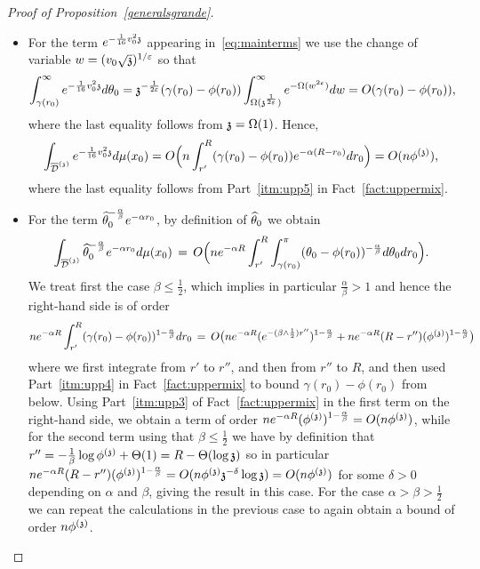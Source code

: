 \begin{proof}[Proof of Proposition~\ref{generalsgrande}]
\begin{itemize}
\item 
For the term $e^{-\frac{1}{16}v_0^2\ss}$ appearing in~\eqref{eq:mainterms} we use the change of variable $w=(v_0\sqrt{\ss})^{1/\varepsilon}$ so that 
\[\int_{\gamma(r_0)}^\infty e^{-\frac{1}{16}v_0^2\ss}d\theta_0=\ss^{-\frac{1}{2\varepsilon}}(\gamma(r_0)-\phi(r_0))\int_{\Omega(\ss^{\frac{1}{2\varepsilon}})}^{\infty}e^{-\Omega(w^{2\varepsilon})}dw=O(\gamma(r_0)-\phi(r_0)),\]
where the last equality follows from $\ss=\Omega(1)$. Hence,
\[
\int_{\ndt}e^{-\frac{1}{16}v_0^2\ss}d\mu(x_0)
=O\Big(n\int_{r'}^R (\gamma(r_0)-\phi(r_0))e^{-\alpha(R-r_0)}dr_0\Big)=O(n\phis),
\]
where the last equality follows from Part~\eqref{itm:upp5} in Fact~\ref{fact:uppermix}.
\item 
For the term $\hatt^{-\frac{\alpha}{\beta}}e^{-\alpha r_0}$, by definition of $\hatt$ we obtain  %
\[
\int_{\ndt}\hatt^{-\frac{\alpha}{\beta}}e^{-\alpha r_0}d\mu(x_0)\,=\,O\Big(ne^{-\alpha R}\int_{r'}^R\int_{\gamma(r_0)}^\pi (\theta_0-\phi(r_0))^{-\frac{\alpha}{\beta}}d\theta_0dr_0\Big).\]
We treat first the case $\beta\leq\frac{1}{2}$, which implies in particular $\frac{\alpha}{\beta}>1$ and hence the right-hand side is of order
\[ne^{-\alpha R}\int_{r'}^R(\gamma(r_0)-\phi(r_0))^{1-\frac{\alpha}{\beta}}dr_0\,=\,O\big(ne^{-\alpha R}(e^{-(\beta\wedge\frac{1}{2})r''})^{1-\frac{\alpha}{\beta}}+ne^{-\alpha R}(R-r'')(\phis)^{1-\frac{\alpha}{\beta}}\big)\]
where we first integrate from $r'$ to $r''$, and then from $r''$ to $R$, and then used Part~\eqref{itm:upp4} in Fact~\ref{fact:uppermix} to bound $\gamma(r_0)-\phi(r_0)$ from below. Using Part~\eqref{itm:upp3} of Fact~\ref{fact:uppermix} in the first term on the right-hand side, we obtain a term of order $ne^{-\alpha R}(\phis)^{1-\frac{\alpha}{\beta}}=O(n\phis)$, while for the second term using that $\beta\leq\frac{1}{2}$ we have by definition that $r''=-\frac{1}{\beta}\log\phis+\Theta(1)=R-\Theta(\log\ss)$ so in particular $ne^{-\alpha R}(R-r'')(\phis)^{1-\frac{\alpha}{\beta}}=O(n\phis\ss^{-\delta}\log\ss)=O(n\phis)$ for some $\delta>0$ depending on $\alpha$ and $\beta$, giving the result in this case.
For the case $\alpha>\beta>\frac12$ we can repeat the calculations in the previous case to again obtain a bound of order $n\phis$.


\end{itemize}
\end{proof}
